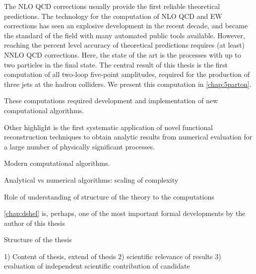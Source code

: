 The NLO QCD corrections usually provide the first reliable theoretical predictions.
The technology for the computation of NLO QCD and EW corrections has seen an explosive development
in the recent decade, and became the standard of the field with many automated public tools available.
However, reaching the percent level accuracy of theoretical predictions requires (at least) NNLO QCD corrections.
Here, the state of the art is the processes with up to two particles in the final state.
The central result of this thesis is the first computation of all two-loop five-point amplitudes, required for the production
of three jets at the hadron colliders. We present this computation in  \cref{chap:5parton}.

These computations required development and implementation of new computational algorithms.

Other highlight is the first systematic application of novel functional reconstruction techniques to obtain analytic results from numerical evaluation
for a large number of physically significant processes.

Modern computational algorithms.

Analytical vs numerical algorithms: scaling of complexity

Role of understanding of structure of the theory to the computations

\cref{chap:dshel} is, perhaps, one of the most important formal developments by the author of this thesis











Structure of the thesis




1) Content of thesis, extend of thesis
2) scientific relevance of results
3) evaluation of independent scientific contribution of candidate


